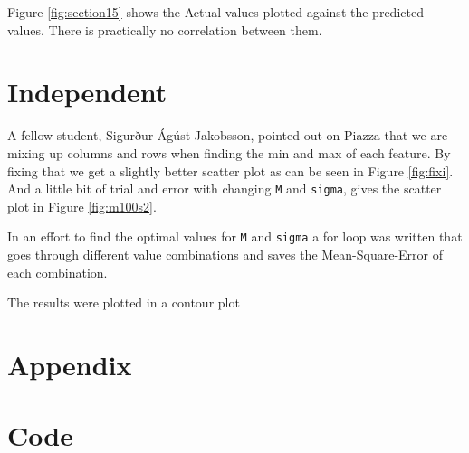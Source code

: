 \documentclass{article}
\begin{document}
Figure \ref{fig:section15} shows the Actual values plotted against the predicted values. There is practically no correlation between them. 

\section*{Independent}
A fellow student, Sigurður Ágúst Jakobsson, pointed out on Piazza that we are mixing up columns and rows when finding the min and max of each feature. By fixing that we get a slightly better scatter plot as can be seen in Figure \ref{fig:fixi}. And a little bit of trial and error with changing \verb!M! and \verb!sigma!, gives the scatter plot in Figure \ref{fig:m100s2}.

In an effort to find the optimal values for \verb!M! and \verb!sigma! a for loop was written that goes through different value combinations and saves the Mean-Square-Error of each combination.

The results were plotted in a contour plot 

\newpage
\section*{Appendix}
\appendix
\section{Code}


\end{document}
